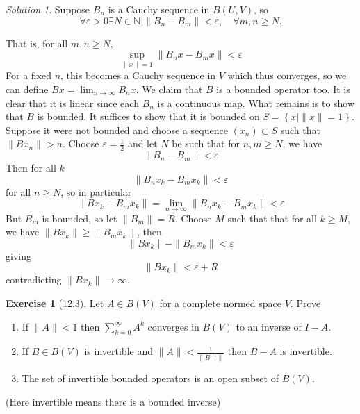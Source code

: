 \documentclass[reqno]{amsart}
\theoremstyle{definition}
\newtheorem{exercise}[theorem]{Exercise}
\theoremstyle{remark}
\newtheorem*{solution}{Solution}
\begin{document}
\begin{solution}
    Suppose $B_n$ is a Cauchy sequence
    in $B \left( U,V \right) $, so
    \[
    \forall \varepsilon > 0 \exists N \in \mathbb{N}  \mid 
    \|B_n - B_m\|< \varepsilon, \quad \forall m,n \ge N.
    \] 

    That is, for all $m, n \ge N$,
    \[
    \sup_{\|x\|= 1} \|B_n x - B_m x \| < \varepsilon
    \] 
    For a fixed $n$, this becomes a Cauchy sequence
    in $V$ which thus converges, so we can define
    $Bx = \lim_{n \to \infty} B_n x$.
    We claim that $B$ is a bounded operator too.
    It is clear that it is linear since each $B_n$ is a 
    continuous map. What remains is to show that
    $B$ is bounded. It suffices to show that
    it is bounded on $ S = \left\{ x  \mid \|x \|= 1 \right\} $.
    Suppose it were not bounded and choose
    a sequence $\left( x_n \right) \subset S$ such that
    $\|Bx_n\|> n$.
    Choose $\varepsilon = \frac{1}{2}$ and let
    $N$ be such that for $n, m \ge N$, we have
    \[
    \|B_n - B_m\|< \varepsilon
    \] 
    Then for all $k$
    \[
    \|B_n x_k -  B_m x_k \|< \varepsilon
    \] 
    for all $n \ge N$, so in particular
    \[
    \|Bx_k - B_m x_k\|
    = \lim_{n \to \infty} \|B_n x_k -  B_m x_k \|< \varepsilon
    \] 
    But $B_m$ is bounded, so let $\|B_m\| = R$.
    Choose $M$ such that that for all $k \ge M$, we have
    $\|Bx_k \| \ge \|B_m x_k\|$, then
    \[
    \|B x_k\| - \|B_m x_k\| < \varepsilon
    \] 
    giving
    \[
    \|B x_k\| < \varepsilon + R
    \] 
    contradicting $\|Bx_k\| \to \infty$.

\end{solution}

    \begin{exercise}[12.3]
        Let $A \in B(V)$ for a complete normed space
        $V$. Prove
        \begin{enumerate}
            \item If $\|A\| < 1$ then
                $\sum_{k=0}^{\infty} A^{k}$ converges
                in $B(V)$ to an inverse of $I - A$.
            \item If $B \in B(V)$ is invertible and
                $\|A\| < \frac{1}{\|B^{-1}\|}$ then
                $B - A$ is invertible.
            \item The set of invertible bounded operators is an
                open subset of $B(V)$.
        \end{enumerate}
        (Here invertible means there is a bounded inverse)
    \end{exercise}
\end{document}
